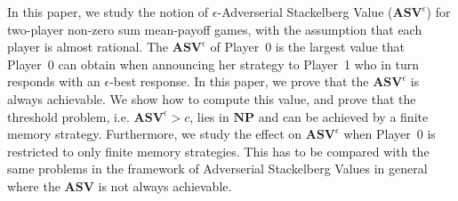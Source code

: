 In this paper, we study the notion of $\epsilon$-Adverserial Stackelberg Value ($\mathbf{ASV}^{\epsilon}$) for two-player non-zero sum mean-payoff games, with the assumption that each player is almost rational. The $\mathbf{ASV}^{\epsilon}$ of Player~0 is the largest value that Player~0 can obtain when announcing her strategy to Player~1 who in turn responds with an $\epsilon$-best response. In this paper, we prove that the $\mathbf{ASV}^{\epsilon}$ is always achievable. We show how to compute this value, and prove that the threshold problem, i.e. $\mathbf{ASV}^{\epsilon} > c$, lies in $\textbf{NP}$ and can be achieved by a finite memory strategy. Furthermore, we study the effect on $\mathbf{ASV}^{\epsilon}$ when Player~0 is restricted to only finite memory strategies. This has to be compared with the same problems in the framework of Adverserial Stackelberg Values in general where the $\mathbf{ASV}$ is not always achievable.